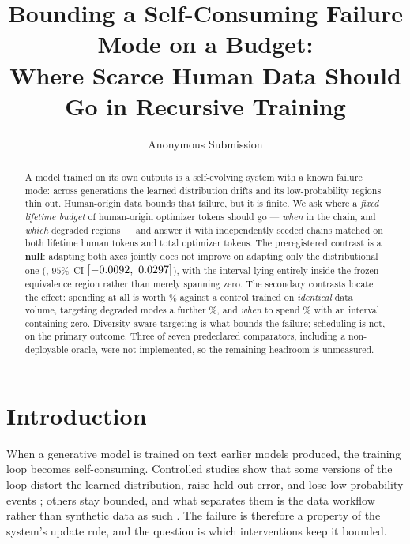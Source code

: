 \documentclass{article}
\title{Bounding a Self-Consuming Failure Mode on a Budget:\\
Where Scarce Human Data Should Go in Recursive Training}
\author{Anonymous Submission}
\begin{document}
\maketitle

\begin{abstract}
A model trained on its own outputs is a self-evolving system with a known failure mode:
across generations the learned distribution drifts and its low-probability regions thin
out. Human-origin data bounds that failure, but it is finite. We ask where a \emph{fixed
lifetime budget} of human-origin optimizer tokens should go --- \emph{when} in the chain,
and \emph{which} degraded regions --- and answer it with \PilotChains{} independently
seeded chains matched on both lifetime human tokens and total optimizer tokens. The
preregistered contrast is a \textbf{null}: adapting both axes jointly does not improve on
adapting only the distributional one (\PilotPrimaryMean{}, $95\%$~CI
$[\PilotPrimaryLow,\allowbreak\ \PilotPrimaryHigh]$), with the interval lying entirely inside the
frozen equivalence region rather than merely spanning zero. The secondary contrasts locate
the effect: spending at all is worth \PilotRandNonePct\% against a control trained on
\emph{identical} data volume, targeting degraded modes a further \PilotSelRandPct\%, and
\emph{when} to spend \PilotSchedRandPct\% with an interval containing zero. Diversity-aware
targeting is what bounds the failure; scheduling is not, on the primary outcome. Three of
seven predeclared comparators, including a non-deployable oracle, were not implemented, so
the remaining headroom is unmeasured.
\end{abstract}

\section{Introduction}
\label{sec:intro}

When a generative model is trained on text earlier models produced, the training loop
becomes self-consuming. Controlled studies show that some versions of the loop distort the
learned distribution, raise held-out error, and lose low-probability events
\cite{shumailov2024collapse,alemohammad2024mad,dohmatob2024tails}; others stay bounded, and
what separates them is the data workflow rather than synthetic data as such
\cite{gerstgrasser2024inevitable,kazdan2025collapse}. The failure is therefore a property
of the system's update rule, and the question is which interventions keep it bounded.
\end{document}
